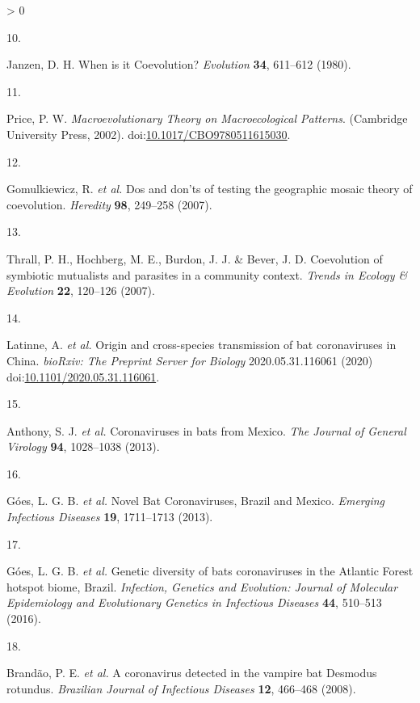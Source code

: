 \documentclass[10pt,oneside]{article}
\newlength{\cslhangindent}
\newlength{\csllabelwidth}
\newenvironment{CSLReferences}[3] %
 {%
  \setlength{\parindent}{0pt}
  \ifodd #1 \everypar{\setlength{\hangindent}{\cslhangindent}}\ignorespaces\fi
  \ifnum #2 > 0
  \setlength{\parskip}{#2\baselineskip}
  \fi
 }%
 {}
\newcommand{\CSLLeftMargin}[1]{\parbox[t]{\maxof{\widthof{#1}}{\csllabelwidth}}{#1}}
\newcommand{\CSLRightInline}[1]{\parbox[t]{\linewidth}{#1}}
\begin{document}
\begin{CSLReferences}{0}{0}
\leavevmode\hypertarget{ref-Janzen1980When}{}%
\CSLLeftMargin{10. }
\CSLRightInline{Janzen, D. H. When is it Coevolution? \emph{Evolution}
\textbf{34}, 611--612 (1980).}

\leavevmode\hypertarget{ref-Price2002Macroevolutionary}{}%
\CSLLeftMargin{11. }
\CSLRightInline{Price, P. W. \emph{Macroevolutionary Theory on
Macroecological Patterns}. (Cambridge University Press, 2002).
doi:\href{https://doi.org/10.1017/CBO9780511615030}{10.1017/CBO9780511615030}.}

\leavevmode\hypertarget{ref-Gomulkiewicz2007Dos}{}%
\CSLLeftMargin{12. }
\CSLRightInline{Gomulkiewicz, R. \emph{et al.} Dos and don'ts of testing
the geographic mosaic theory of coevolution. \emph{Heredity}
\textbf{98}, 249--258 (2007).}

\leavevmode\hypertarget{ref-Thrall2007Coevolution}{}%
\CSLLeftMargin{13. }
\CSLRightInline{Thrall, P. H., Hochberg, M. E., Burdon, J. J. \& Bever,
J. D. Coevolution of symbiotic mutualists and parasites in a community
context. \emph{Trends in Ecology \& Evolution} \textbf{22}, 120--126
(2007).}

\leavevmode\hypertarget{ref-Latinne2020Origin}{}%
\CSLLeftMargin{14. }
\CSLRightInline{Latinne, A. \emph{et al.} Origin and cross-species
transmission of bat coronaviruses in China. \emph{bioRxiv: The Preprint
Server for Biology} 2020.05.31.116061 (2020)
doi:\href{https://doi.org/10.1101/2020.05.31.116061}{10.1101/2020.05.31.116061}.}

\leavevmode\hypertarget{ref-Anthony2013Coronaviruses}{}%
\CSLLeftMargin{15. }
\CSLRightInline{Anthony, S. J. \emph{et al.} Coronaviruses in bats from
Mexico. \emph{The Journal of General Virology} \textbf{94}, 1028--1038
(2013).}

\leavevmode\hypertarget{ref-Goes2013Novel}{}%
\CSLLeftMargin{16. }
\CSLRightInline{Góes, L. G. B. \emph{et al.} Novel Bat Coronaviruses,
Brazil and Mexico. \emph{Emerging Infectious Diseases} \textbf{19},
1711--1713 (2013).}

\leavevmode\hypertarget{ref-Goes2016Genetic}{}%
\CSLLeftMargin{17. }
\CSLRightInline{Góes, L. G. B. \emph{et al.} Genetic diversity of bats
coronaviruses in the Atlantic Forest hotspot biome, Brazil.
\emph{Infection, Genetics and Evolution: Journal of Molecular
Epidemiology and Evolutionary Genetics in Infectious Diseases}
\textbf{44}, 510--513 (2016).}

\leavevmode\hypertarget{ref-Brandao2008Coronavirus}{}%
\CSLLeftMargin{18. }
\CSLRightInline{Brandão, P. E. \emph{et al.} A coronavirus detected in
the vampire bat Desmodus rotundus. \emph{Brazilian Journal of Infectious
Diseases} \textbf{12}, 466--468 (2008).}


\end{CSLReferences}
\end{document}
